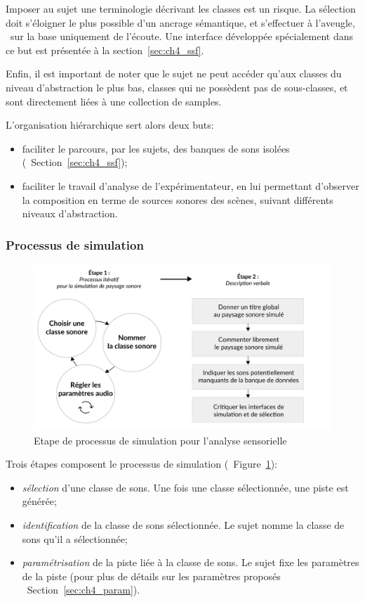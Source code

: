 Imposer au sujet une terminologie  décrivant les classes est un risque. La sélection doit s'éloigner le plus possible d'un ancrage sémantique, et s'effectuer à l'aveugle, \ie~sur la base uniquement de l'écoute. Une interface développée spécialement dans ce but est présentée à la section~\ref{sec:ch4_ssf}.

Enfin, il est important de noter que le sujet ne peut accéder qu'aux classes du niveau d'abstraction le plus bas, classes qui ne possèdent pas de sous-classes, et sont directement liées à une collection de samples.

L’organisation hiérarchique sert alors deux buts:

\begin{itemize}
\item faciliter le parcours, par les sujets, des banques de sons isolées (\cf~Section~\ref{sec:ch4_ssf});
\item faciliter le travail d'analyse de l'expérimentateur, en lui permettant d'observer la composition en terme de sources sonores des scènes, suivant différents niveaux d'abstraction.
\end{itemize}

\subsubsection{Processus de simulation}
\label{sec:ch4_processSimu}

\begin{figure}[t]
        \myfloatalign
        \includegraphics[width=.8\linewidth]{gfx/ch_4/4}
       \caption{Etape de processus de simulation pour l'analyse sensorielle}\label{fig:etapeSimu}
\end{figure}

Trois étapes composent le processus de simulation (\cf~Figure~\ref{fig:etapeSimu}):

\begin{itemize}
\item \emph{sélection} d'une classe de sons. Une fois une classe sélectionnée, une piste est générée; 
\item \emph{identification} de la classe de sons sélectionnée. Le sujet nomme la classe de sons qu'il a sélectionnée;
\item \emph{paramétrisation} de la piste liée à la classe de sons. Le sujet fixe les paramètres de la piste (pour plus de détails sur les paramètres proposés \cf~Section~\ref{sec:ch4_param}).
\end{itemize}

